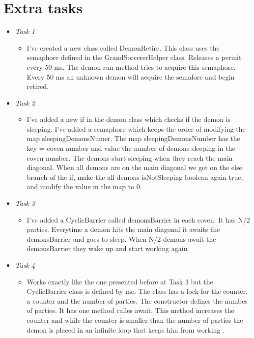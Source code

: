 \documentclass[14pt]{article}
\begin{document}
\section*{Extra tasks}
\vspace{5 mm}
\begin{itemize}
            \item \textit{Task 1}\\
            \begin{itemize}
                \item I've created a new class called DemonRetire. This class uses the semaphore defined in the GrandSorcererHelper class. Releases a permit every 50 ms. The demon run method tries to acquire this semaphore. Every 50 ms an unknown demon will acquire the semafore and begin retired.
            \end{itemize}
            \item \textit{Task 2}\\
            \begin{itemize}
                \item I've added a new if in the demon class which checks if the demon is sleeping. I've added a semaphore which keeps the order of modifying the map sleepingDemonsNumer. The map sleepingDemonsNumber has the key = coven number and value the number of demons sleeping in the coven number. The demons start sleeping when they reach the main diagonal. When all demons are on the main diagonal we get on the else branch of the if, make the all demons isNotSleeping boolean again true, and modify the value in the map to 0.
            \end{itemize}
            \item \textit{Task 3}\\
            \begin{itemize}
                \item I've added a CyclicBarrier called demonsBarrier in each coven. It has N/2 parties. Everytime a demon hits the main diagonal it awaits the demonsBarrier and goes to sleep. When N/2 demons await the demonsBarrier they wake up and start working again
            \end{itemize}
            \item \textit{Task 4}\\
            \begin{itemize}
                \item Works exactly like the one presented before at Task 3 but the CyclicBarrier class is defined by me. The class has a lock for the counter, a counter and the number of parties. The constructor defines the numbes of parties. It has one method calles await. This method increases the counter and while the counter is smaller than the number of parties the demon is placed in an infinite loop that keeps him from working .
            \end{itemize}
            
\end{itemize}
\end{document}
